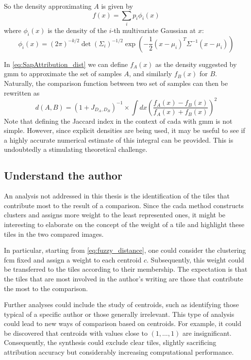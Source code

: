 \begin{toReview}
\noindent So the density approximating $A$ is given by
\[
f(x) = \sum_i p_i\phi_i(x)
\]
where $\phi_i(x)$ is the density of the $i$-th multivariate Gaussian at $x$:
\[
	\phi_i(x) = \left(2\pi\right)^{-k/2}\det\left(\Sigma_i\right)^{-1/2}\exp\left(-\frac12\left(x-\mu_i\right)^T\Sigma^{-1}\left(x-\mu_i\right)\right)
\]

\noindent In \cref{eq:SapAttribution_dist} we can define $f_{A}(x)$ as the density suggested by \gls{gmm} to approximate the set of samples $A$, and similarly $f_B(x)$ for $B$. Naturally, the comparison function between two set of samples can then be rewritten as
\[
	d(A,B)=(1+J_{D_A, D_B})^{-1} \times \int dx\left(\frac{f_A(x)-f_B(x)}{f_A(x)+f_B(x)}\right)^2
\]
\noindent Note that defining the Jaccard index in the context of \gls{cada} with \gls{gmm} is not simple. However, since explicit densities are being used, it may be useful to see if a highly accurate numerical estimate of this integral can be provided. This is undoubtedly a stimulating theoretical challenge.

\subsection{Understand the author}
An analysis not addressed in this thesis is the identification of the tiles that contribute most to the result of a comparison. Since the \gls{cada} method constructs clusters and assigns more weight to the least represented ones, it might be interesting to elaborate on the concept of the weight of a tile and highlight these tiles in the two compared images.

\noindent In particular, starting from \cref{eq:fuzzy_distance}, one could consider the clustering \gls{fcm} fixed and assign a weight to each centroid $c$. Subsequently, this weight could be transferred to the tiles according to their membership. The expectation is that the tiles that are most involved in the author's writing are those that contribute the most to the comparison.

\noindent Further analyses could include the study of centroids, such as identifying those typical of a specific author or those generally irrelevant. This type of analysis could lead to new ways of comparison based on centroids. For example, it could be discovered that centroids with values close to $(1,\ldots,1)$ are insignificant. Consequently, the synthesis could exclude clear tiles, slightly sacrificing attribution accuracy but considerably increasing computational performance.


\end{toReview}
